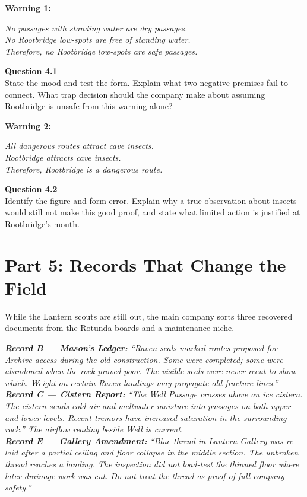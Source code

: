 \documentclass[12pt]{article}
\newcommand{\cluebox}[1]{\par\vspace{0.12em}\noindent\begin{minipage}{\textwidth}\itshape #1\end{minipage}\par\vspace{0.12em}}
\begin{document}
\textbf{Warning 1:}
\cluebox{No passages with standing water are dry passages.\\
No Rootbridge low-spots are free of standing water.\\
Therefore, no Rootbridge low-spots are safe passages.}

\textbf{Question 4.1}\\[-0.15em]
State the mood and test the form. Explain what two negative premises fail to connect. What trap decision should the company make about assuming Rootbridge is unsafe from this warning alone?

\textbf{Warning 2:}
\cluebox{All dangerous routes attract cave insects.\\
Rootbridge attracts cave insects.\\
Therefore, Rootbridge is a dangerous route.}

\textbf{Question 4.2}\\[-0.15em]
Identify the figure and form error. Explain why a true observation about insects would still not make this good proof, and state what limited action is justified at Rootbridge's mouth.

\newpage
\section*{Part 5: Records That Change the Field}
While the Lantern scouts are still out, the main company sorts three recovered documents from the Rotunda boards and a maintenance niche.

\cluebox{\textbf{Record B --- Mason's Ledger:} ``Raven seals marked routes proposed for Archive access during the old construction. Some were completed; some were abandoned when the rock proved poor. The visible seals were never recut to show which. Weight on certain Raven landings may propagate old fracture lines.''\\[0.25em]
\textbf{Record C --- Cistern Report:} ``The Well Passage crosses above an ice cistern. The cistern sends cold air and meltwater moisture into passages on both upper and lower levels. Recent tremors have increased saturation in the surrounding rock.'' The airflow reading beside Well is current.\\[0.25em]
\textbf{Record E --- Gallery Amendment:} ``Blue thread in Lantern Gallery was re-laid after a partial ceiling and floor collapse in the middle section. The unbroken thread reaches a landing. The inspection did not load-test the thinned floor where later drainage work was cut. Do not treat the thread as proof of full-company safety.''}
\end{document}

